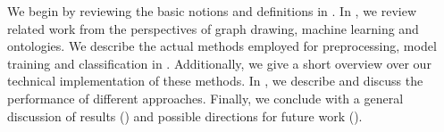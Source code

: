 \documentclass[
	fontsize=10pt, %
	twoside=true, %
	secnumdepth=1, %
  toc=indentunnumbered %
]{kaobook}
\begin{document}




We begin by reviewing the basic notions and definitions in
. In , we review related work from the
perspectives of graph drawing, machine learning and ontologies.
We describe the actual methods employed for preprocessing, model training and
classification in . Additionally, we give a short overview over
our technical implementation of these methods. In ,
we describe and discuss the performance of different approaches. Finally, we
conclude with a general discussion of results () and
possible directions for future work ().











\end{document}
